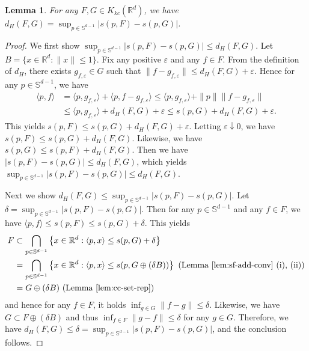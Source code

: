\documentclass[11pt,reqno]{amsart}
\newtheorem{lemma}{Lemma}
\begin{document}
\begin{lemma}\label{lem:Hd-sf-conv}
For any $F,G \in K_{kc}(\mathbb{R}^d)$, we have $d_H(F, G) = \sup_{p \in \mathbb{S}^{d-1}}|s(p,F) - s(p,G)|$. 
\end{lemma}
\begin{proof}
We first show $\sup_{p \in \mathbb{S}^{d-1}}|s(p,F) - s(p,G)|\leq d_H(F,G)$. Let $B = \{x \in \mathbb{R}^d: \|x\|\leq 1\}$. Fix any positive $\varepsilon$ and any $f \in F$. From the definition of $d_H$, there exists $g_{f, \varepsilon} \in G$ such that $\|f - g_{f,\varepsilon}\| \leq d_H(F,G) + \varepsilon$. Hence for any $p \in \mathbb{S}^{d-1}$, we have 
\begin{align*}
\langle p, f\rangle 
&= \langle p, g_{f,\varepsilon}\rangle + \langle p, f-g_{f,\varepsilon} \rangle 
\leq \langle p, g_{f,\varepsilon}\rangle + \|p\|\|f - g_{f,\varepsilon}\|\\
&\leq \langle p, g_{f,\varepsilon}\rangle + d_H(F,G)+\varepsilon
\leq s(p, G) + d_H(F,G) + \varepsilon. 
\end{align*}
This yields $s(p,F) \leq s(p,G) + d_H(F,G) + \varepsilon$. Letting $\varepsilon \downarrow 0$, we have $s(p,F) \leq s(p,G) + d_H(F,G)$. Likewise, we have $s(p,G) \leq s(p,F) + d_H(F,G)$. Then we have $|s(p,F) - s(p,G)| \leq d_H(F,G)$, which yields $\sup_{p \in \mathbb{S}^{d-1}}|s(p,F) - s(p,G)|\leq d_H(F,G)$. 

Next we show  $d_H(F,G) \leq \sup_{p \in \mathbb{S}^{d-1}}|s(p,F) - s(p,G)|$. Let $\delta = \sup_{p \in \mathbb{S}^{d-1}}|s(p,F) - s(p,G)|$. Then for any $p \in \mathbb{S}^{d-1}$ and any $f \in F$, we have $\langle p, f \rangle \leq s(p,F) \leq s(p,G) + \delta$. This yields
\begin{align*}
F &\subset \bigcap_{p \in \mathbb{S}^{d-1}}\left\{x \in \mathbb{R}^d: \langle p,x\rangle \leq s(p, G) + \delta \right\} \\
&= \bigcap_{p \in \mathbb{S}^{d-1}}\left\{x \in \mathbb{R}^d: \langle p,x\rangle \leq s(p, G \oplus (\delta B)) \right\}\ (\text{Lemma \ref{lem:sf-add-conv} (i), (ii)})\\ 
&= G \oplus (\delta B)\ (\text{Lemma \ref{lem:cc-set-rep}})
\end{align*}
and hence for any $f \in F$, it holds $\inf_{g \in G}\|f - g\| \leq \delta$. Likewise, we have $G \subset F \oplus (\delta B)$ and thus $\inf_{f \in F}\|g - f\| \leq \delta$ for any $g \in G$. Therefore, we have $d_H(F,G) \leq \delta = \sup_{p \in \mathbb{S}^{d-1}}|s(p,F) - s(p,G)|$, and the conclusion follows.
\end{proof}
\end{document}
